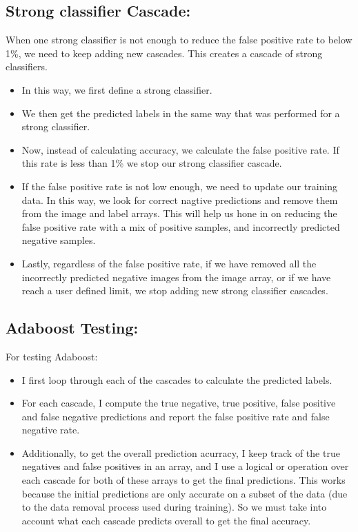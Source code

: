 \documentclass{article}
\begin{document}
\subsection{Strong classifier Cascade: }
When one strong classifier is not enough to reduce the false positive rate to below 1\%, we need to keep adding new cascades. This creates a cascade of strong classifiers.

\begin{itemize}
    \item In this way, we first define a strong classifier.
    \item We then get the predicted labels in the same way that was performed for a strong classifier.
    \item Now, instead of calculating accuracy, we calculate the false positive rate. If this rate is less than 1\% we stop our strong classifier cascade. 
    \item If the false positive rate is not low enough, we need to update our training data. In this way, we look for correct nagtive predictions and remove them from the image and label arrays. This will help us hone in on reducing the false positive rate with a mix of positive samples, and incorrectly predicted negative samples.
    \item Lastly, regardless of the false positive rate, if we have removed all the incorrectly predicted negative images from the image array, or if we have reach a user defined limit, we stop adding new strong classifier cascades.
\end{itemize}


\subsection{Adaboost Testing: }
For testing Adaboost:
\begin{itemize}
    \item I first loop through each of the cascades to calculate the predicted labels. 
    \item For each cascade, I compute the true negative, true positive, false positive and false negative predictions and report the false positive rate and false negative rate.
    \item Additionally, to get the overall prediction acurracy, I keep track of the true negatives and false positives in an array, and I use a logical or operation over each cascade for both of these arrays to get the final predictions. This works because the initial predictions are only accurate on a subset of the data (due to the data removal process used during training). So we must take into account what each cascade predicts overall to get the final accuracy.
\end{itemize}
\end{document}
